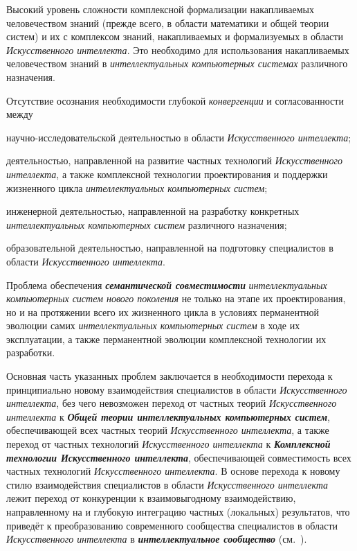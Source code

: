 \begin{textitemize}
	\medskip
	\item 
	Высокий уровень сложности комплексной формализации  накапливаемых человечеством знаний (прежде всего, в области математики и общей теории систем) и их  с комплексом знаний, накапливаемых и формализуемых в области \textit{Искусственного интеллекта}. Это необходимо для  использования накапливаемых человечеством знаний в \textit{интеллектуальных компьютерных системах} различного назначения.
	\medskip
	\item 
	Отсутствие осознания необходимости глубокой \textit{конвергенции} и согласованности между
	\begin{textitemize}
		\item научно-исследовательской деятельностью в области \textit{Искусственного интеллекта};
		\item деятельностью, направленной на развитие частных технологий \textit{Искусственного интеллекта}, а также комплексной технологии проектирования и поддержки жизненного цикла \textit{интеллектуальных компьютерных систем};
		\item инженерной деятельностью, направленной на разработку конкретных \textit{интеллектуальных компьютерных систем} различного назначения;
		\item образовательной деятельностью, направленной на подготовку специалистов в области \textit{Искусственного интеллекта}.
	\end{textitemize}
	\item 
	Проблема обеспечения \textbf{\textit{семантической совместимости}} \textit{интеллектуальных компьютерных систем нового поколения} не только на этапе их проектирования, но и на протяжении всего их жизненного цикла в условиях перманентной эволюции самих \textit{интеллектуальных компьютерных систем} в ходе их эксплуатации, а также перманентной эволюции комплексной технологии их разработки.
\end{textitemize}

Основная часть указанных проблем заключается в необходимости перехода к принципиально новому   взаимодействия специалистов в области \textit{Искусственного интеллекта}, без чего невозможен переход от частных теорий \textit{Искусственного интеллекта} к \textbf{\textit{Общей теории интеллектуальных компьютерных систем}}, обеспечивающей  всех частных теорий \textit{Искусственного интеллекта}, а также переход от частных технологий \textit{Искусственного интеллекта} к \textbf{\textit{Комплексной технологии Искусственного интеллекта}}, обеспечивающей совместимость всех частных технологий \textit{Искусственного интеллекта}. В основе перехода к новому стилю взаимодействия специалистов в области \textit{Искусственного интеллекта} лежит переход от конкуренции к  взаимовыгодному взаимодействию, направленному на  и глубокую интеграцию частных (локальных) результатов, что приведёт к преобразованию современного сообщества специалистов в области \textit{Искусственного интеллекта} в \textbf{\textit{интеллектуальное сообщество}} (см.~\textit{}).

